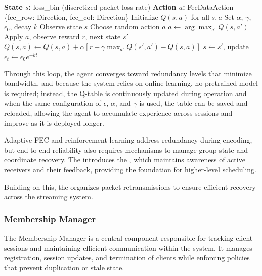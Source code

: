 \begin{algorithm}[H]
	\caption{Q-Learning for Adaptive FEC}
	\label{alg:qlearning}
	\begin{algorithmic}[1]
		\State \textbf{State $s$:} loss\_bin (discretized packet loss rate)
		\State \textbf{Action $a$:} FecDataAction \{fec\_row: Direction, fec\_col: Direction\}
		\State Initialize $Q(s, a)$ for all $s, a$
		\State Set $\alpha$, $\gamma$, $\epsilon_0$, decay $k$
		\State Observe state $s$
		\State Choose random action $a$
		\Else
		\State $a \gets \arg\max_{a'} Q(s, a')$
		\EndIf
		\State Apply $a$, observe reward $r$, next state $s'$
		\State $Q(s, a) \gets Q(s, a) + \alpha \left[r + \gamma \max_{a'} Q(s', a') - Q(s, a)\right]$
		\State $s \gets s'$, update $\epsilon_t \gets \epsilon_0 e^{-kt}$
		\EndFor
	\end{algorithmic}
\end{algorithm}

\quad Through this loop, the agent converges toward redundancy levels that minimize bandwidth, and because the system relies on online learning, no pretrained model is required; instead, the Q-table is continuously updated during operation and when the same configuration of $\epsilon$, $\alpha$, and $\gamma$ is used, the table can be saved and reloaded, allowing the agent to accumulate experience across sessions and improve as it is deployed longer. 

\quad Adaptive FEC and reinforcement learning address redundancy during encoding, but end-to-end reliability also requires mechanisms to manage group state and coordinate recovery. The \textbf{} introduces the \textbf{}, which maintains awareness of active receivers and their feedback, providing the foundation for higher-level scheduling. 

\quad Building on this, the \textbf{} organizes packet retransmissions to ensure efficient recovery across the streaming system.

\subsubsection{Membership Manager}
\label{sec:membership manager}

\quad The Membership Manager is a central component responsible for tracking client sessions and maintaining efficient communication within the system. It manages registration, session updates, and termination of clients while enforcing policies that prevent duplication or stale state.

